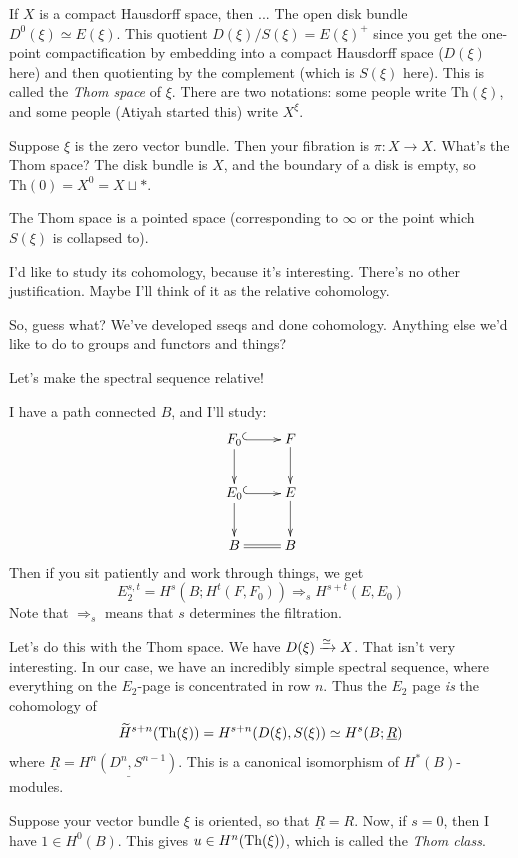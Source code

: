 If $X$ is a compact Hausdorff space, then ...
The open disk bundle $D^0(\xi) \simeq E(\xi)$.
This quotient $D(\xi)/S(\xi) = E(\xi)^+$ since you get the one-point compactification by embedding into a compact Hausdorff space ($D(\xi)$ here) and then quotienting by the complement (which is $S(\xi)$ here).
This is called the \emph{Thom space} of $\xi$.
There are two notations: some people write $\mathrm{Th}(\xi)$, and some people (Atiyah started this) write $X^\xi$.

\begin{example}[Dumb]
    Suppose $\xi$ is the zero vector bundle.
    Then your fibration is $\pi:X \to X$.
    What's the Thom space?
    The disk bundle is $X$, and the boundary of a disk is empty, so $\mathrm{Th}(0) = X^0 = X\sqcup \ast$.
\end{example}

The Thom space is a pointed space (corresponding to $\infty$ or the point which $S(\xi)$ is collapsed to).

I'd like to study its cohomology, because it's interesting.
There's no other justification.
Maybe I'll think of it as the relative cohomology.

So, guess what?
We've developed sseqs and done cohomology.
Anything else we'd like to do to groups and functors and things?

Let's make the spectral sequence relative!

I have a path connected $B$, and I'll study:
\begin{equation*}
    \xymatrix{
	F_0 \ar[d] \ar@{^(->}[r] & F\ar[d]\\
	E_0\ar[d] \ar@{^(->}[r] & E\ar[d]\\
	B\ar@{=}[r] & B
    }
\end{equation*}
Then if you sit patiently and work through things, we get
$$
E^{s,t}_2 = H^s(B; H^t(F, F_0)) \Rightarrow_s H^{s+t}(E, E_0)
$$
Note that $\Rightarrow_s$ means that $s$ determines the filtration.

Let's do this with the Thom space.
We have $D(\xi) \xrightarrow{{\simeq}} X$.
That isn't very interesting.
In our case, we have an incredibly simple spectral sequence, where everything on the $E_2$-page is concentrated in row $n$.
Thus the $E_2$ page \emph{is} the cohomology of
$$\widetilde{H}^{s+n}(\operatorname{Th}(\xi)) = H^{s+n}(D(\xi),S(\xi)) \simeq H^s(B; \underline{R})$$
where $\underline{R} = \underline{H^n(D^n,S^{n-1})}$.
This is a canonical isomorphism of $H^\ast(B)$-modules.

Suppose your vector bundle $\xi$ is oriented, so that $\underline{R} = R$.
Now, if $s=0$, then I have $1\in H^0(B)$.
This gives $u\in H^n(\operatorname{Th}(\xi))$, which is called the \emph{Thom class}.


